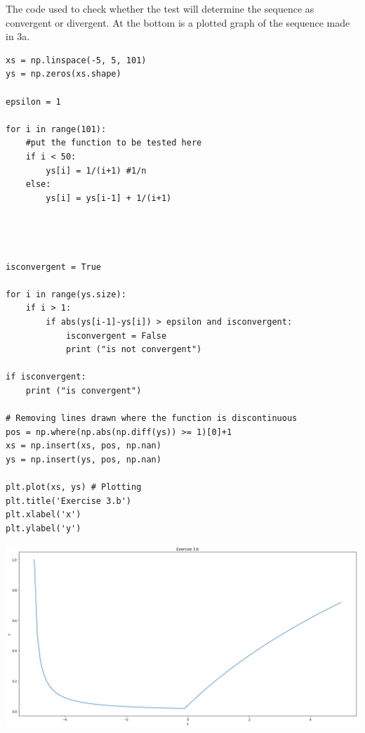 The code used to check whether the test will determine the sequence as convergent or divergent. At the bottom is a plotted graph of the sequence made in 3a.
\begin{verbatim}
xs = np.linspace(-5, 5, 101)
ys = np.zeros(xs.shape)

epsilon = 1

for i in range(101):
    #put the function to be tested here
    if i < 50:
        ys[i] = 1/(i+1) #1/n
    else:
        ys[i] = ys[i-1] + 1/(i+1)
    
    
    
    
isconvergent = True
    
for i in range(ys.size):
    if i > 1:
        if abs(ys[i-1]-ys[i]) > epsilon and isconvergent:
            isconvergent = False
            print ("is not convergent")
            
if isconvergent:
    print ("is convergent")
    
# Removing lines drawn where the function is discontinuous
pos = np.where(np.abs(np.diff(ys)) >= 1)[0]+1
xs = np.insert(xs, pos, np.nan)
ys = np.insert(ys, pos, np.nan)
    
plt.plot(xs, ys) # Plotting 
plt.title('Exercise 3.b')
plt.xlabel('x')
plt.ylabel('y')
\end{verbatim}
\includegraphics[width=\linewidth]{3bgraph.png}
